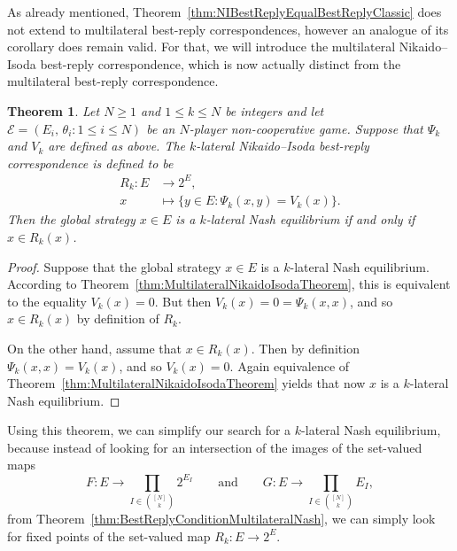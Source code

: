 \documentclass[a4paper,11pt,reqno,english]{amsart}
\theoremstyle{plain}
\newtheorem{theorem}{Theorem}[section]
\theoremstyle{definition}
\newcommand{\Ecal}{\mathcal{E}}
\begin{document}
\medskip
As already mentioned, Theorem~\ref{thm:NIBestReplyEqualBestReplyClassic} does not extend to multilateral best-reply correspondences, however an analogue of its corollary does remain valid.
For that, we will introduce the multilateral Nikaido--Isoda best-reply correspondence, which is now actually distinct from the multilateral best-reply correspondence.

\begin{theorem}\label{thm:MultilateralNIBestReply}
	Let $N\geq 1$ and $1\leq k\leq N$ be integers and let $\Ecal=(E_i,\,\theta_i : 1\leq i\leq N)$ be an $N$-player non-cooperative game.
	Suppose that $\Psi_k$ and $V_k$ are defined as above.
	The $k$-lateral Nikaido--Isoda best-reply correspondence is defined to be
	\begin{align*}
		R_k\colon E & \longrightarrow 2^{E} ,                      \\
		x           & \longmapsto \{y\in E : \Psi_k(x,y)=V_k(x)\}.
	\end{align*}
	Then the global strategy $x\in E$ is a $k$-lateral Nash equilibrium if and only if $x\in R_k(x)$.
\end{theorem}

\begin{proof}
	Suppose that the global strategy  $x\in E$ is a $k$-lateral Nash equilibrium.
	According to Theorem~\ref{thm:MultilateralNikaidoIsodaTheorem}, this is equivalent to the equality $V_k(x)=0$.
	But then $V_k(x) = 0 = \Psi_k(x,x)$, and so $x\in R_k(x)$ by definition of $R_k$.

	\medskip
	On the other hand, assume that $x\in R_k(x)$.
	Then by definition $\Psi_k(x,x) = V_k(x)$, and so $V_k(x) = 0$.
	Again equivalence of Theorem~\ref{thm:MultilateralNikaidoIsodaTheorem} yields that now $x$ is a $k$-lateral Nash equilibrium.
\end{proof}

\medskip
Using this theorem, we can simplify our search for a $k$-lateral Nash equilibrium, because instead of looking for an intersection of the images of the set-valued maps
\begin{displaymath}
	F\colon E\longrightarrow \prod_{I\in\binom{[N]}{k}} 2^{E_I} \qquad \text{and} \qquad G\colon E\longrightarrow \prod_{I\in\binom{[N]}{k}}E_I,
\end{displaymath}
from Theorem~\ref{thm:BestReplyConditionMultilateralNash}, we can simply look for fixed points of the set-valued map $R_k\colon E\longrightarrow 2^{E}$.

\end{document}
